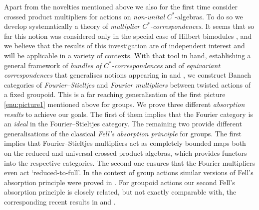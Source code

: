 \documentclass[11 pt, leqno]{amsart}
\numberwithin{equation}{section}
\theoremstyle{plain}
\theoremstyle{definition}
\begin{document}
Apart from the novelties mentioned above we also for the first time consider crossed product multipliers for actions on \emph{non-unital} $C^*$-algebras.
To do so we develop systematically a theory of \emph{multiplier $C^*$-correspondences}.
It seems that so far this notion was considered only in the special case of Hilbert bimodules \cite{ER,Schweizer}, and we believe that the results of this investigation are of independent interest and will be applicable in a variety of contexts. 
With that tool in hand, establishing  a general framework of \emph{bundles of $C^*$-correspondences} and  of \emph{equivariant correspondences} that generalises notions appearing in \cite{LeGall,EKQR} and \cite{Deaconu}, we construct  Banach categories of \emph{Fourier--Stieltjes} and \emph{Fourier multipliers} between twisted actions of a fixed groupoid. 
This is a far reaching generalisation of the first picture \ref{enu:picture1} mentioned above for groups. 
We prove three different \emph{absorption results} to achieve our goals. 
The first of them implies that the Fourier category is an \emph{ideal} in the Fourier--Stieltjes category. 
The remaining two provide different generalisations of the classical \emph{Fell's absorption principle} for groups. 
The first implies that Fourier--Stieltjes multipliers act as completely bounded maps both on the reduced and universal crossed product algebras, which provides functors into the respective categories. 
The second one ensures that the Fourier multipliers even act `reduced-to-full'. 
In the context of group actions similar versions of Fell's absorption principle were proved in \cite{BedosContiregular, BedosConti}. 
For groupoid actions our second Fell's absorption principle is closely related, but not exactly comparable with, the corresponding recent results in \cite{Kranz} and \cite{BussMartinez}. 
\end{document}
